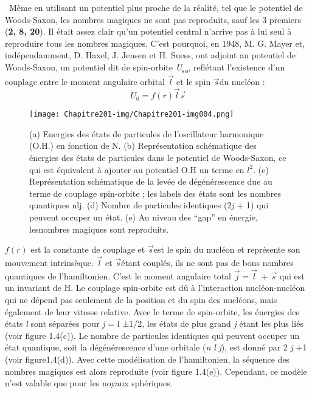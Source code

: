\ Même en utilisant un potentiel plus proche de la réalité, tel que le potentiel de Woods-Saxon, les nombres magiques ne
sont pas reproduits, sauf les 3 premiers (\textbf{2, 8, 20}). Il était assez clair qu'un potentiel central n'arrive pas
à lui seul à reproduire tous les nombres magiques.
 C'est pourquoi, en 1948, M. G. Mayer et, indépendamment, D. Haxel, J. Jensen et H. Suess, ont adjoint au
potentiel de Woods-Saxon, un potentiel dit de spin-orbite \textit{U}\textsubscript{so}, reflétant l'existence d'un
couplage entre le moment angulaire orbital $\overrightarrow l$ et le spin $\overrightarrow s$du nucléon :
\begin{equation} U_0=f(r)\overrightarrow l\overrightarrow
s\end{equation}

 \begin{figure}[htb]
 	\texttt{[image: Chapitre201-img/Chapitre201-img004.png]}
 	\caption{(a) Energies des états de particules de l'oscillateur harmonique (O.H.) en fonction de N. (b) Représentation
schématique des énergies des états de particules dans le potentiel de Woods-Saxon, ce qui est équivalent à ajouter au
potentiel O.H un terme en $ l^2$. (c) Représentation schématique de la levée de dégénérescence due au
terme de couplage spin-orbite ; les labels des états sont les nombres quantiques nlj. (d) Nombre de particules
identiques (2\textit{j} + 1) qui peuvent occuper un état. (e) Au niveau des “gap” en énergie, lesnombres magiques sont
reproduits.
}
 \end{figure}

$f(r)$ est la constante de couplage et $\overrightarrow s$est le spin du nucléon et représente son mouvement
intrinsèque. $\overrightarrow l$ et $\overrightarrow s$étant couplés, ils ne sont pas de bons nombres quantiques de
l'hamiltonien. C'est le moment angulaire total $\overrightarrow j=\overrightarrow l$\ + $\overrightarrow s$ qui est un
invariant de H. Le couplage spin-orbite est dû à l'interaction nucléon-nucléon qui ne dépend pas seulement de la
position et du spin des nucléons, mais également de leur vitesse relative. Avec le terme de spin-orbite, les énergies
des états \textit{l} sont séparées pour \textit{j} = l ±1/2, les états de plus grand \textit{j} étant les plus liés
(voir figure 1.4(c)). Le nombre de particules identiques qui peuvent occuper un état quantique, soit la dégénérescence
d'une orbitale (\textit{n l} \textit{j}), est donné par 2 \textit{j} +1 (voir figure1.4(d)). Avec cette modélisation de
l'hamiltonien, la séquence des nombres magiques est alors reproduite (voir figure 1.4(e)). Cependant, ce modèle n'est
valable que pour les noyaux sphériques.

